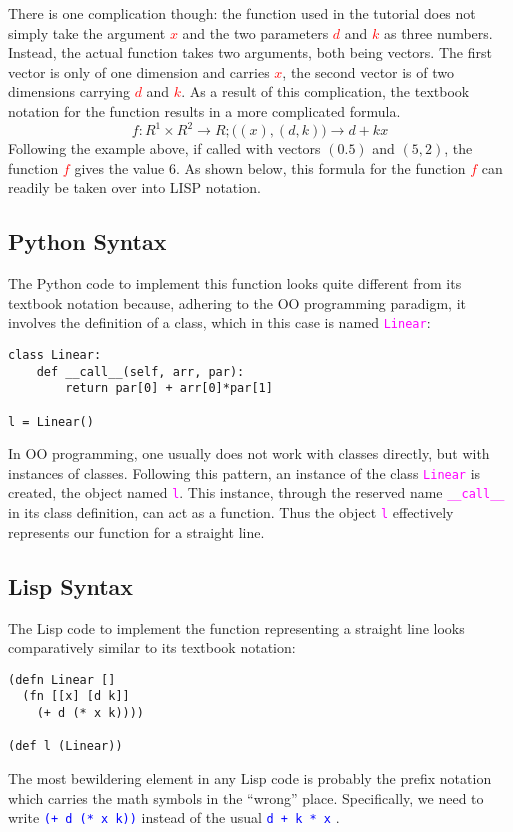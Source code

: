 \documentclass{IEEEcsmag}
\begin{document}
There is one complication though: the function used in the tutorial does not simply take the argument \textcolor{red}{$x$} and the two parameters \textcolor{red}{$d$} and \textcolor{red}{$k$} as three numbers. Instead, the actual function takes two arguments, both being vectors. The first vector is only of one dimension and carries \textcolor{red}{$x$}, the second vector is of two dimensions carrying \textcolor{red}{$d$} and \textcolor{red}{$k$}. As a result of this complication, the textbook notation for the function results in a more complicated formula.
{\color{red}
\begin{equation}
f\colon R^1 \times R^2 \rightarrow R; 
\bigl( \left( x \right), \left( d,k \right) \bigr) \rightarrow d + k x
\end{equation}}
Following the example above, if called with vectors $(0.5)$ and $(5, 2)$, the function \textcolor{red}{$f$} gives the value 6. As shown below, this formula for the function \textcolor{red}{$f$} can readily be taken over into LISP notation.\vspace*{-5pt}

\subsection{Python Syntax}
The Python code to implement this function looks quite different from its textbook notation because, adhering to the OO programming paradigm, it involves the definition of a class, which in this case is named \texttt{\textcolor{magenta}{Linear}}:
{\color{magenta}\begin{verbatim}
class Linear:
    def __call__(self, arr, par):
        return par[0] + arr[0]*par[1]

l = Linear()
\end{verbatim}}
In OO programming, one usually does not work with classes directly, but with instances of classes. Following this pattern, an instance of the class \texttt{\textcolor{magenta}{Linear}} is created, the object named \texttt{\textcolor{magenta}{l}}. This instance, through the reserved name \texttt{\textcolor{magenta}{\_\_call\_\_}} in its class definition, can act as a function. Thus the object \texttt{\textcolor{magenta}{l}} effectively represents our function for a straight line.\vspace*{-5pt}

\subsection{Lisp Syntax}
The Lisp code to implement the function representing a straight line looks comparatively similar to its textbook notation:
{\color{blue}\begin{verbatim}
(defn Linear []
  (fn [[x] [d k]]
    (+ d (* x k))))

(def l (Linear))
\end{verbatim}}
The most bewildering element in any Lisp code is probably the prefix notation which carries the math symbols in the “wrong” place. Specifically, we need to write \texttt{\textcolor{blue}{(+ d (* x k))}} instead of the usual \texttt{\textcolor{blue}{d + k * x}} .
\end{document}
